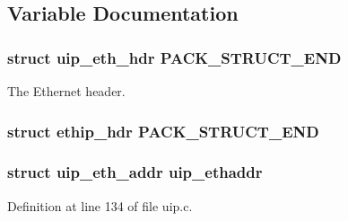 \subsection{Variable Documentation}
\hypertarget{group__uiparp_ga1c9b41c7403c38cd943ecf0a91543119}{
\subsubsection[{PACK\_\-STRUCT\_\-END}]{\setlength{\rightskip}{0pt plus 5cm}struct {\bf uip\_\-eth\_\-hdr} {\bf PACK\_\-STRUCT\_\-END}}}
\label{group__uiparp_ga1c9b41c7403c38cd943ecf0a91543119}
The Ethernet header. \hypertarget{group__uiparp_ga61953c615dbf189b18855737b02471ff}{
\subsubsection[{PACK\_\-STRUCT\_\-END}]{\setlength{\rightskip}{0pt plus 5cm}struct {\bf ethip\_\-hdr}  {\bf PACK\_\-STRUCT\_\-END}}}
\label{group__uiparp_ga61953c615dbf189b18855737b02471ff}
\hypertarget{group__uiparp_ga499bb98a0b4ae9a98553ede81317606d}{
\subsubsection[{uip\_\-ethaddr}]{\setlength{\rightskip}{0pt plus 5cm}struct {\bf uip\_\-eth\_\-addr} {\bf uip\_\-ethaddr}}}
\label{group__uiparp_ga499bb98a0b4ae9a98553ede81317606d}


Definition at line 134 of file uip.c.

